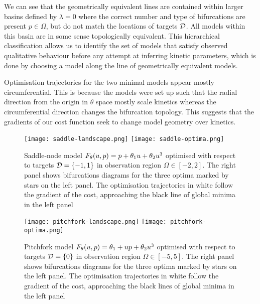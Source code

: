 We can see that the geometrically equivalent lines are contained within larger basins defined by $\lambda=0$ where the correct number and type of bifurcations are present $p\in\Omega$, but do not match the locations of targets $\mathcal{D}$. All models within this basin are in some sense topologically equivalent. This hierarchical classification allows us to identify the set of models that satisfy observed qualitative behaviour \cite{Stumpf2019ParameterBifurcations} before any attempt at inferring kinetic parameters, which is done by choosing a model along the line of geometrically equivalent models.

Optimisation trajectories for the two minimal models appear mostly circumferential. This is because the models were set up such that the radial direction from the origin in $\theta$ space mostly scale kinetics whereas the circumferential direction changes the bifurcation topology. This suggests that the gradients of our cost function seek to change model geometry over kinetics.

\begin{figure}
\centering
\texttt{[image: saddle-landscape.png]}
\texttt{[image: saddle-optima.png]}
\caption{Saddle-node model $F_{\theta}(u,p) = p + \theta_{1}u+\theta_{2}u^3$ optimised with respect to targets $\mathcal{D}=\{-1,1\}$ in observation region $\Omega\in[-2,2]$. The right panel shows bifurcations diagrams for the three optima marked by stars on the left panel. The optimisation trajectories in white follow the gradient of the cost, approaching the black line of global minima in the left panel}
\label{fig:saddle-node:results}
\end{figure}

\begin{figure}
\centering
\texttt{[image: pitchfork-landscape.png]}
\texttt{[image: pitchfork-optima.png]}
\caption{Pitchfork model $F_{\theta}(u,p) = \theta_{1} + u p +\theta_{2}u^3$ optimised with respect to targets $\mathcal{D}=\{0\}$ in observation region $\Omega\in[-5,5]$. The right panel shows bifurcations diagrams for the three optima marked by stars on the left panel. The optimisation trajectories in white follow the gradient of the cost, approaching the black lines of global minima in the left panel}
\label{fig:pitchfork:results}
\end{figure}

